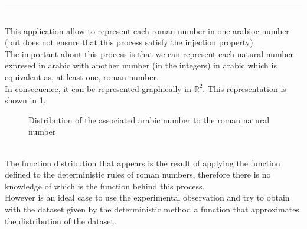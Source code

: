 \documentclass[a4paper, 11pt]{article}
\begin{document}
\rule{\linewidth}{0.4pt}\\
This application allow to represent each roman number in one arabioc number (but does not ensure that this process satisfy the injection property).\\
The important about this process is that we can represent each natural number expresed in arabic with another number (in the integers) in arabic which is equivalent as, at least one, roman number.\\
In consecuence, it can be represented graphically in $\mathbb{R}^2$. This representation is shown in \ref{romans}.
\begin{figure}[h]
    \centering
    \caption{Distribution of the associated arabic number to the roman natural number}
    \label{romans}
\end{figure}\\
The function distribution that appears is the result of applying the function defined to the deterministic rules of roman numbers, therefore there is no knowledge of which is the function behind this process.\\
However is an ideal case to use the experimental observation and try to obtain with the dataset given by the deterministic method a function that approximates the distribution of the dataset.
\end{document}
